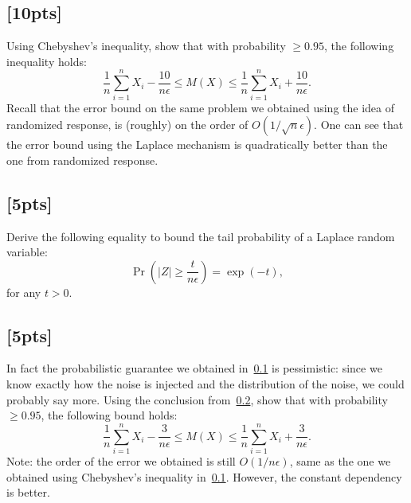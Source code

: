 \documentclass[letterpaper,11pt]{article}
\theoremstyle{definition}
\begin{document}
\subsection{[10pts]}
\label{p:4.1}
Using Chebyshev's inequality, show that with probability $\geq 0.95$, the following inequality holds:
\begin{equation*}
    \frac{1}{n}\sum_{i=1}^n X_i - \frac{10}{n\epsilon} \leq M(X) \leq \frac{1}{n}\sum_{i=1}^n X_i + \frac{10}{n\epsilon}.
\end{equation*}
Recall that the error bound on the same problem we obtained using the idea of randomized response, is (roughly) on the order of $O(1/\sqrt{n}\epsilon)$. One can see that the error bound using the Laplace mechanism is quadratically better than the one from randomized response.


\subsection{[5pts]}
\label{p:4.2}
Derive the following equality to bound the tail probability of a Laplace random variable:
\begin{equation*}
    \Pr\left(|Z| \geq \frac{t}{n\epsilon}\right) = \exp(-t),
\end{equation*}
for any $t > 0$.

\subsection{[5pts]}
\label{p:4.3}
In fact the probabilistic guarantee we obtained in~\ref{p:4.1} is pessimistic: since we know exactly how the noise is injected and the distribution of the noise, we could probably say more. Using the conclusion from~\ref{p:4.2}, show that with probability $\geq 0.95$, the following bound holds:
\begin{equation*}
    \frac{1}{n}\sum_{i=1}^n X_i - \frac{3}{n\epsilon} \leq M(X) \leq \frac{1}{n}\sum_{i=1}^n X_i + \frac{3}{n\epsilon}.
\end{equation*}
Note: the order of the error we obtained is still $O(1/n\epsilon)$, same as the one we obtained using Chebyshev's inequality in~\ref{p:4.1}. However, the constant dependency is better. 
\end{document}
